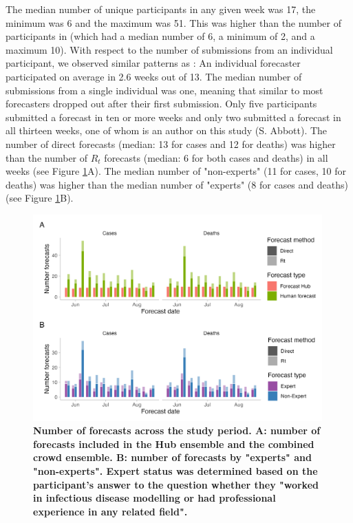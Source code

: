 \documentclass[10pt,a4paper,twocolumn]{article}
\begin{document}
The median number of unique participants in any given week was 17, the minimum was 6 and the maximum was 51. This was higher than the number of participants in \cite{bosseComparingHumanModelbased2022} (which had a median number of 6, a minimum of 2, and a maximum 10). With respect to the number of submissions from an individual participant, we observed similar patterns as \cite{bosseComparingHumanModelbased2022}: An individual forecaster participated on average in 2.6 weeks out of 13. The median number of submissions from a single individual was one, meaning that similar to \citep{bosseComparingHumanModelbased2022} most forecasters dropped out after their first submission. Only five participants submitted a forecast in ten or more weeks and only two submitted a forecast in all thirteen weeks, one of whom is an author on this study (S. Abbott). The number of direct forecasts (median: 13 for cases and 12 for deaths) was higher than the number of $R_t$ forecasts (median: 6 for both cases and deaths) in all weeks (see Figure \ref{fig:num-forecasters}A). The median number of "non-experts" (11 for cases, 10 for deaths) was higher than the median number of "experts" (8 for cases and deaths) (see Figure \ref{fig:num-forecasters}B). 

\begin{figure}
\centering
\includegraphics[width=0.99\textwidth]{../output/figures/num-forecasters.png}
\caption{\bf{Number of forecasts across the study period.} A: number of forecasts included in the Hub ensemble and the combined crowd ensemble. B: number of forecasts by "experts" and "non-experts". Expert status was determined based on the participant's answer to the question whether they "worked in infectious disease modelling or had professional experience in any related field".}
\label{fig:num-forecasters}
\end{figure}
\end{document}
